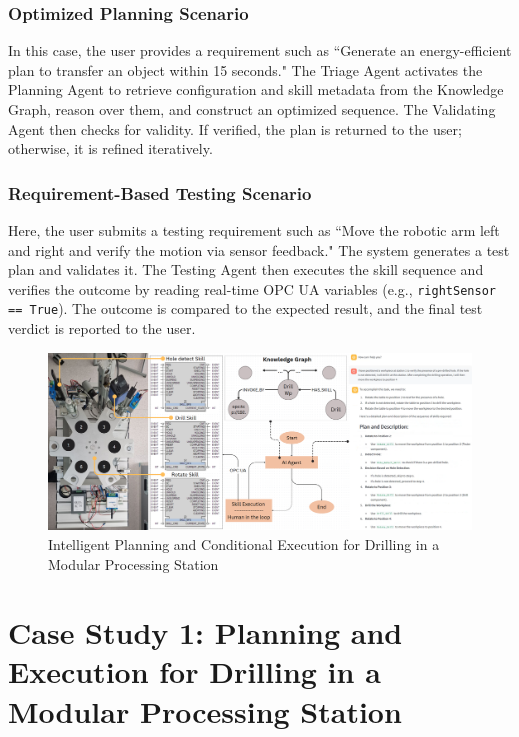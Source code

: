 \begin{bibunit}
    \subsubsection{Optimized Planning Scenario}
    In this case, the user provides a requirement such as ``Generate an energy-efficient plan to transfer an object within 15 seconds." The Triage Agent activates the Planning Agent to retrieve configuration and skill metadata from the Knowledge Graph, reason over them, and construct an optimized sequence. The Validating Agent then checks for validity. If verified, the plan is returned to the user; otherwise, it is refined iteratively.
    
    \subsubsection{Requirement-Based Testing Scenario}
    Here, the user submits a testing requirement such as ``Move the robotic arm left and right and verify the motion via sensor feedback." The system generates a test plan and validates it. The Testing Agent then executes the skill sequence and verifies the outcome by reading real-time OPC UA variables (e.g., \texttt{rightSensor == True}). The outcome is compared to the expected result, and the final test verdict is reported to the user.
    
    
    \begin{figure}
        \includegraphics[width=1\textwidth]{MX_Papers/Paper13/images/PS_Arch.png}
        \caption{Intelligent Planning and Conditional Execution for Drilling in a Modular Processing Station}
        \label{fig:ps_arch}
    \end{figure}
    
    
    
    
    \section{Case Study 1: Planning and Execution for Drilling in a Modular Processing Station}
    

\end{bibunit}
